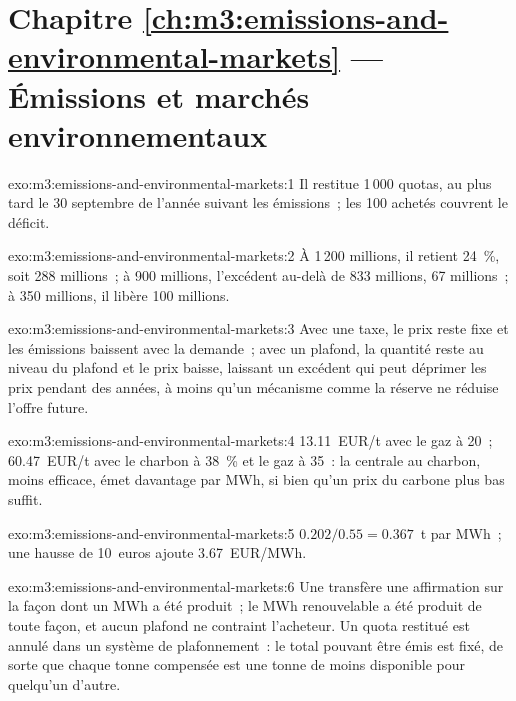 \section*{Chapitre \ref{ch:m3:emissions-and-environmental-markets} --- Émissions et marchés environnementaux}

\begin{solution}{exo:m3:emissions-and-environmental-markets:1}
Il restitue 1\,000 quotas, au plus tard le 30 septembre de l'année suivant les émissions~; les 100 achetés
couvrent le déficit.
\end{solution}

\begin{solution}{exo:m3:emissions-and-environmental-markets:2}
À 1\,200 millions, il retient 24~\%, soit 288 millions~; à 900 millions, l'excédent au-delà de 833 millions, 67
millions~; à 350 millions, il libère 100 millions.
\end{solution}

\begin{solution}{exo:m3:emissions-and-environmental-markets:3}
Avec une taxe, le prix reste fixe et les émissions baissent avec la demande~; avec un plafond, la quantité reste au niveau du plafond
et le prix baisse, laissant un excédent qui peut déprimer les prix pendant des années, à moins qu'un mécanisme comme la
réserve ne réduise l'offre future.
\end{solution}

\begin{solution}{exo:m3:emissions-and-environmental-markets:4}
\qty{13.11}{EUR/t} avec le gaz à \qty{20}{}~; \qty{60.47}{EUR/t} avec le charbon à 38~\% et le gaz à
\qty{35}{}~: la centrale au charbon, moins efficace, émet davantage par MWh, si bien qu'un prix du carbone plus bas suffit.
\end{solution}

\begin{solution}{exo:m3:emissions-and-environmental-markets:5}
$0.202/0.55 = 0.367$~t par MWh~; une hausse de 10~euros ajoute \qty{3.67}{EUR/MWh}.
\end{solution}

\begin{solution}{exo:m3:emissions-and-environmental-markets:6}
Une  transfère une affirmation sur la façon dont un MWh a été produit~; le MWh renouvelable a été produit
de toute façon, et aucun plafond ne contraint l'acheteur. Un quota restitué est annulé dans un système de plafonnement~: le total
pouvant être émis est fixé, de sorte que chaque tonne compensée est une tonne de moins disponible pour quelqu'un d'autre.
\end{solution}

